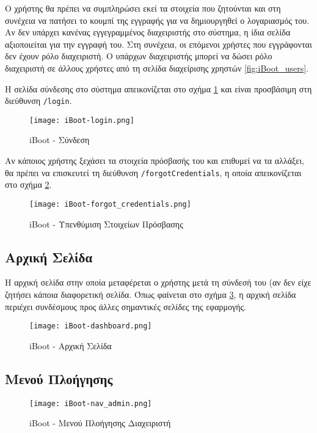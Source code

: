 Ο χρήστης θα πρέπει να συμπληρώσει εκεί τα στοιχεία που ζητούνται και στη συνέχεια να πατήσει το κουμπί της εγγραφής για να δημιουργηθεί ο λογαριασμός του. Αν δεν υπάρχει κανένας εγγεγραμμένος διαχειριστής στο σύστημα, η ίδια σελίδα αξιοποιείται για την εγγραφή του. Στη συνέχεια, οι επόμενοι χρήστες που εγγράφονται δεν έχουν ρόλο διαχειριστή. Ο υπάρχων διαχειριστής μπορεί να δώσει ρόλο διαχειριστή σε άλλους χρήστες από τη σελίδα διαχείρισης χρηστών \ref{fig:iBoot_users}.

Η σελίδα σύνδεσης στο σύστημα απεικονίζεται στο σχήμα \ref{fig:iBoot_login} και είναι προσβάσιμη στη διεύθυνση \verb!/login!.
\begin{figure}[ht]
	\centering
	\texttt{[image: iBoot-login.png]}
	\caption{iBoot - Σύνδεση}
	\label{fig:iBoot_login}
\end{figure}

Αν κάποιος χρήστης ξεχάσει τα στοιχεία πρόσβασής του και επιθυμεί να τα αλλάξει, θα πρέπει να επισκευτεί τη διεύθυνση \verb!/forgotCredentials!, η οποία απεικονίζεται στο σχήμα \ref{fig:iBoot_forgot_credentials}.
\begin{figure}[ht]
	\centering
	\texttt{[image: iBoot-forgot\_credentials.png]}
	\caption{iBoot - Υπενθύμιση Στοιχείων Πρόσβασης}
	\label{fig:iBoot_forgot_credentials}
\end{figure}
\FloatBarrier

\subsection{Αρχική Σελίδα}
Η αρχική σελίδα στην οποία μεταφέρεται ο χρήστης μετά τη σύνδεσή του (αν δεν είχε ζητήσει κάποια διαφορετική σελίδα. Όπως φαίνεται στο σχήμα \ref{fig:iBoot_dashboard}, η αρχική σελίδα περιέχει συνδέσμους προς άλλες σημαντικές σελίδες της εφαρμογής.
\FloatBarrier
\begin{figure}[ht]
	\centering
	\texttt{[image: iBoot-dashboard.png]}
	\caption{iBoot - Αρχική Σελίδα}
	\label{fig:iBoot_dashboard}
\end{figure}
\FloatBarrier

\subsection{Μενού Πλοήγησης}
\FloatBarrier
\begin{figure}[ht]
	\centering
	\texttt{[image: iBoot-nav\_admin.png]}
	\caption{iBoot - Μενού Πλοήγησης Διαχειριστή}
	\label{fig:iBoot_nav_admin}
\end{figure}


